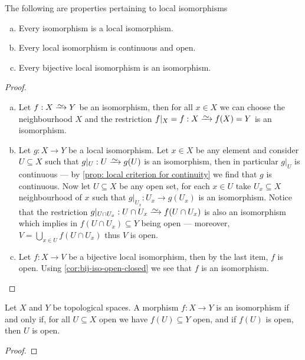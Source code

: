 \begin{proposition}\label{prop:properties-local-homeomorphism}
The following are properties pertaining to local isomorphisms
\begin{enumerate}[(a)]\setlength\itemsep{0em}
\item Every isomorphism is a local isomorphism.
\item Every local isomorphism is continuous and open.
\item Every bijective local isomorphism is an isomorphism.
\end{enumerate}
\end{proposition}

\begin{proof}
\begin{enumerate}[(a)]\setlength\itemsep{0em}
\item Let \(f: X \isoto Y\) be an isomorphism, then for all \(x \in X\) we can
  choose the neighbourhood \(X\) and the restriction \(f|_X = f: X \isoto f(X) =
  Y\) is an isomorphism.
\item Let \(g: X \to Y\) be a local isomorphism. Let \(x \in X\) be any element
  and consider \(U \subseteq X\) such that \(g|_U: U \isoto g(U)\) is an
  isomorphism, then in particular \(g|_U\) is continuous --- by \cref{prop:
  local criterion for continuity} we find that \(g\) is continuous. Now let \(U
  \subseteq X\) be any open set, for each \(x \in U\) take \(U_x \subseteq X\)
  neighbourhood of \(x\) such that \(g|_{U_x}: U_x \to g(U_x)\) is an
  isomorphism. Notice that the restriction \(g|_{U \cap U_x}: U \cap U_x \isoto
  f(U \cap U_x)\) is also an isomorphism which implies in \(f(U \cap U_x)
  \subseteq Y\) being open --- moreover, \(V = \bigcup_{x \in U} f(U \cap
  U_{x})\) thus \(V\) is open.
\item Let \(f: X \to V\) be a bijective local isomorphism, then by the last item,
  \(f\) is open. Using \cref{cor:bij-iso-open-closed} we see that \(f\) is an
  isomorphism.
\end{enumerate}
\end{proof}

\begin{proposition}\label{prop:homeomorphism-equivalence}
Let \(X\) and \(Y\) be topological spaces. A morphism \(f: X \to Y\) is an
isomorphism if and only if, for all \(U \subseteq X\) open we have \(f(U)
\subseteq Y\) open, and if \(f(U)\) is open, then \(U\) is open.
\end{proposition}

\begin{proof}
\end{proof}

